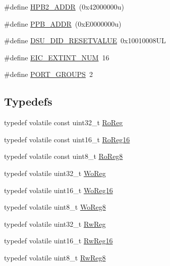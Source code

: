 \begin{DoxyCompactItemize}
\item 
\#define \mbox{\hyperlink{group___s_a_m_d21_g15_a__definitions_gaef42fa53ddf169a2a50be70d29f73571}{H\+P\+B2\+\_\+\+A\+D\+DR}}~(0x42000000u)
\item 
\#define \mbox{\hyperlink{group___s_a_m_d21_g15_a__definitions_ga8895d0a3a9a3126cc44330f86c8ce564}{P\+P\+B\+\_\+\+A\+D\+DR}}~(0x\+E0000000u)
\item 
\#define \mbox{\hyperlink{group___s_a_m_d21_g15_a__definitions_gada75131d542c9e1966238f5488f89bd6}{D\+S\+U\+\_\+\+D\+I\+D\+\_\+\+R\+E\+S\+E\+T\+V\+A\+L\+UE}}~0x10010008\+UL
\item 
\#define \mbox{\hyperlink{group___s_a_m_d21_g15_a__definitions_ga88ebc38c95506296f5d21f82476296ae}{E\+I\+C\+\_\+\+E\+X\+T\+I\+N\+T\+\_\+\+N\+UM}}~16
\item 
\#define \mbox{\hyperlink{group___s_a_m_d21_g15_a__definitions_gab9243ffe03a1dc631b57a495b4b3d467}{P\+O\+R\+T\+\_\+\+G\+R\+O\+U\+PS}}~2
\end{DoxyCompactItemize}
\subsection*{Typedefs}
\begin{DoxyCompactItemize}
\item 
typedef volatile const uint32\+\_\+t \mbox{\hyperlink{group___s_a_m_d21_g15_a__definitions_ga5d556f8391af4141be23f7334ac9dd68}{Ro\+Reg}}
\item 
typedef volatile const uint16\+\_\+t \mbox{\hyperlink{group___s_a_m_d21_g15_a__definitions_gaebf6e33c2d49a802e06e22a95ea9d0d0}{Ro\+Reg16}}
\item 
typedef volatile const uint8\+\_\+t \mbox{\hyperlink{group___s_a_m_d21_g15_a__definitions_ga0d957f1433aaf5d70e4dc2b68288442d}{Ro\+Reg8}}
\item 
typedef volatile uint32\+\_\+t \mbox{\hyperlink{group___s_a_m_d21_g15_a__definitions_gac0f96d4e8018367b38f527007cf0eafd}{Wo\+Reg}}
\item 
typedef volatile uint16\+\_\+t \mbox{\hyperlink{group___s_a_m_d21_g15_a__definitions_ga0ab0e5f6c8301aa1c2068e511d854094}{Wo\+Reg16}}
\item 
typedef volatile uint8\+\_\+t \mbox{\hyperlink{group___s_a_m_d21_g15_a__definitions_ga5e336e5a36ee12ebeafb021108e5275b}{Wo\+Reg8}}
\item 
typedef volatile uint32\+\_\+t \mbox{\hyperlink{group___s_a_m_d21_g15_a__definitions_gacf1496e3bbe303e55f627fc7558a68c7}{Rw\+Reg}}
\item 
typedef volatile uint16\+\_\+t \mbox{\hyperlink{group___s_a_m_d21_g15_a__definitions_gacce07556c80fc352ae607f225f19fed5}{Rw\+Reg16}}
\item 
typedef volatile uint8\+\_\+t \mbox{\hyperlink{group___s_a_m_d21_g15_a__definitions_gae361754be775bb192f85821d3ab33c17}{Rw\+Reg8}}
\end{DoxyCompactItemize}



